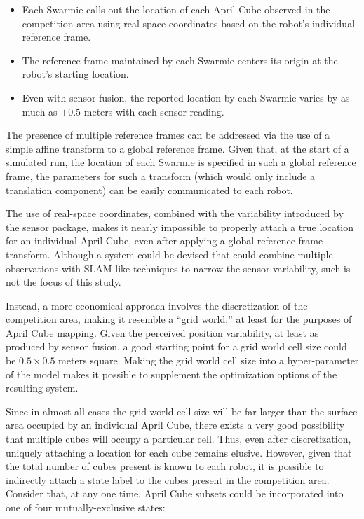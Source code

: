 \documentclass[sigconf,authordraft]{acmart}
\begin{document}
\begin{itemize}
  \item Each Swarmie calls out the location of each April Cube observed in the competition area using real-space coordinates based on the robot's individual reference frame.
  \item The reference frame maintained by each Swarmie centers its origin at the robot's starting location.
  \item Even with sensor fusion, the reported location by each Swarmie varies by as much as $\pm 0.5$ meters with each sensor reading.
\end{itemize}

The presence of multiple reference frames can be addressed via the use of a simple affine transform to a global reference frame. Given that, at the start of a simulated run, the location of each Swarmie is specified in such a global reference frame, the parameters for such a transform (which would only include a translation component) can be easily communicated to each robot.

The use of real-space coordinates, combined with the variability introduced by the sensor package, makes it nearly impossible to properly attach a true location for an individual April Cube, even after applying a global reference frame transform. Although a system could be devised that could combine multiple observations with SLAM-like techniques to narrow the sensor variability, such is not the focus of this study.

Instead, a more economical approach involves the discretization of the competition area, making it resemble a ``grid world,'' at least for the purposes of April Cube mapping. Given the perceived position variability, at least as produced by sensor fusion, a good starting point for a grid world cell size could be $0.5 \times 0.5$ meters square. Making the grid world cell size into a hyper-parameter of the model makes it possible to supplement the optimization options of the resulting system.

Since in almost all cases the grid world cell size will be far larger than the surface area occupied by an individual April Cube, there exists a very good possibility that multiple cubes will occupy a particular cell. Thus, even after discretization, uniquely attaching a location for each cube remains elusive. However, given that the total number of cubes present is known to each robot, it is possible to indirectly attach a state label to the cubes present in the competition area. Consider that, at any one time, April Cube subsets could be incorporated into one of four mutually-exclusive states:
\end{document}
